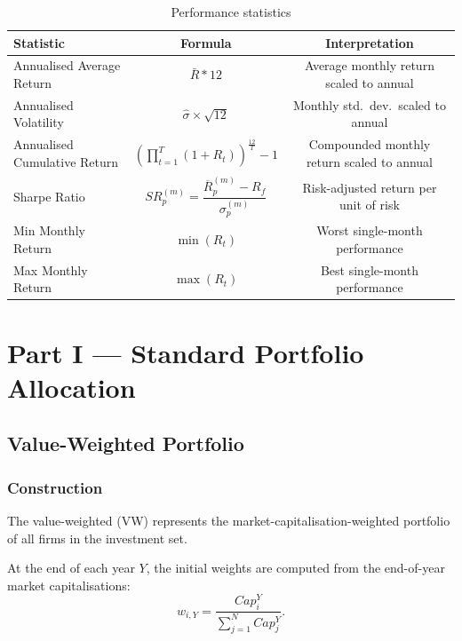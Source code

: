 \documentclass[11pt,a4paper]{article}
\begin{document}
\begin{table}[H]
    \centering
    \caption{Performance statistics}
    \begin{tabular}{lcc}
        \toprule
        \textbf{Statistic} & \textbf{Formula} & \textbf{Interpretation} \\
        \midrule
        Annualised Average Return     & $\bar{R}*{12}$                & Average monthly return scaled to annual \\[4pt]
        Annualised Volatility & $\hat{\sigma} \times \sqrt{12}$         & Monthly std.\ dev.\ scaled to annual \\[4pt]
        Annualised Cumulative Return  & $\left(\prod_{t=1}^{T}(1 + R_t)\right)^{\!\frac{12}{T}} - 1$ & Compounded monthly return scaled to annual\\[4pt]
        Sharpe Ratio          & $SR_p^{(m)} = \dfrac{\overline{R}_p^{(m)} - R_f}{\sigma_p^{(m)}}$ & Risk-adjusted return per unit of risk \\[10pt]
        Min Monthly Return    & $\min(R_t)$                             & Worst single-month performance \\[4pt]
        Max Monthly Return    & $\max(R_t)$                             & Best single-month performance \\
        \bottomrule
    \end{tabular}
\end{table}

\section{Part I --- Standard Portfolio Allocation}
\label{sec:part1}

\subsection{Value-Weighted Portfolio}

\subsubsection{Construction}

The value-weighted (VW) represents the market-capitalisation-weighted portfolio of all firms in the investment set.

At the end of each year \(Y\), the initial weights are computed from the end-of-year market capitalisations:
\begin{equation}
w_{i,Y} = \frac{Cap^{Y}_{i}}{\sum_{j=1}^{N} Cap^{Y}_{j}}.
\end{equation}
\end{document}
